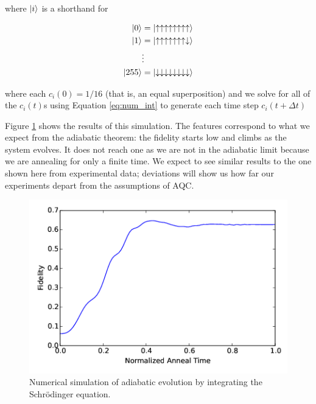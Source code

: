 where $\mathinner{|{i}\rangle}$ is a shorthand for 

\begin{align}
	\mathinner{|{0}\rangle} &= \mathinner{|{\uparrow\uparrow\uparrow\uparrow\uparrow\uparrow\uparrow\uparrow}\rangle}\notag\\
	\mathinner{|{1}\rangle} &= \mathinner{|{\uparrow\uparrow\uparrow\uparrow\uparrow\uparrow\uparrow\downarrow}\rangle}\notag\\
			& \vdots\notag\\
	\mathinner{|{255}\rangle} &= \mathinner{|{\downarrow\downarrow\downarrow\downarrow\downarrow\downarrow\downarrow\downarrow}\rangle}
\end{align}

where each $c_i(0) = 1/16$ (that is, an equal superposition) and we solve for all of the $c_i(t)$s using Equation \ref{eq:num_int} to generate each time step $c_i(t + \Delta t)$

Figure \ref{fig:simulate} shows the results of this simulation.  The features correspond to what we expect from the adiabatic theorem: the fidelity starts low and climbs as the system evolves.  It does not reach one as we are not in the adiabatic limit because we are annealing for only a finite time.  We expect to see similar results to the one shown here from experimental data; deviations will show us how far our experiments depart from the assumptions of AQC.
\begin{figure}
	\includegraphics[bb= 0 0 441 297]{img/simulate.png}
	\caption[Simulated AQC]{Numerical simulation of adiabatic evolution by integrating the Schr\"odinger equation.}
	\label{fig:simulate}
\end{figure}
